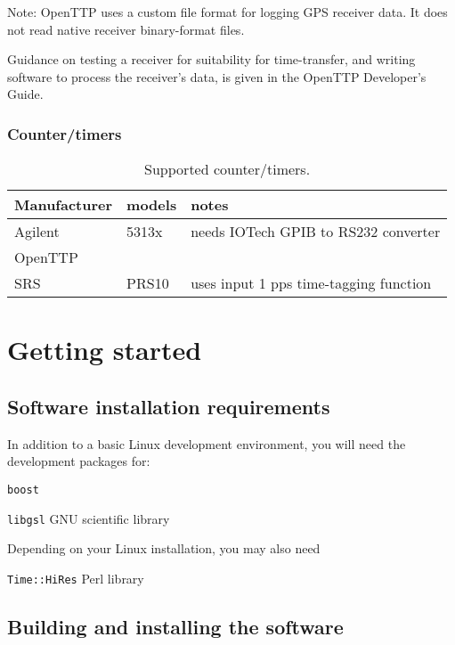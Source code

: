 \documentclass[11pt,a4paper,openany,oneside]{book}
\newcommand{\cc}[1]{{\texttt{#1}}}
\newenvironment{description*}%
  {\setlength{\parskip}{0pt}%
	 \begin{description}%
		\setlength{\topsep}{-12pt}%
		\setlength{\itemindent}{-12pt}%
    \setlength{\itemsep}{0pt}%
		\setlength{\itemsep}{0pt}}%
  {\end{description}}
\begin{document}
	Note: OpenTTP uses a custom file format for logging GPS receiver data. It does not read native receiver binary-format files.
	
	Guidance on testing a receiver for suitability for time-transfer, and writing software to process
	the receiver's data, is given in the OpenTTP Developer's Guide.
	
	\subsection{Counter/timers}
	
	\begin{table}
	\begin{tabular}{lll}
	Manufacturer & models & notes \\ \hline
	Agilent & 5313x &  needs IOTech GPIB to RS232 converter\\
	OpenTTP &  & \\
	SRS & PRS10 & uses input 1 pps time-tagging function\\
	\end{tabular}
	\caption{Supported counter/timers.}
	\end{table}
	
\chapter{Getting started}

\section{Software installation requirements}

In addition to a basic Linux development environment, you will need the development packages for:
\begin{description*}
	\item[\cc{boost}]   
	\item[\cc{libgsl}] GNU scientific library
\end{description*}

Depending on your Linux installation, you may also need
\begin{description*}
	\item[\cc{Time::HiRes}] Perl library
\end{description*}

\section{Building and installing the software}
\end{document}
